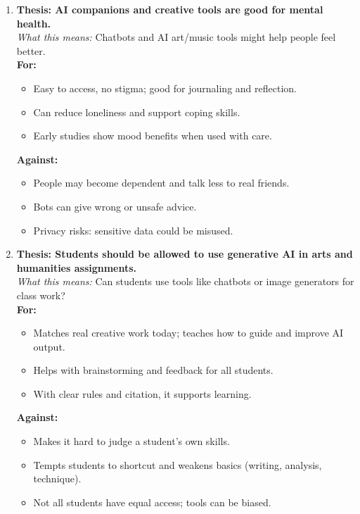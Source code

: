 \documentclass[12pt]{article}
\begin{document}
\begin{enumerate}
\item \textbf{Thesis: AI companions and creative tools are good for mental health.}\\
\emph{What this means:} Chatbots and AI art/music tools might help people feel better.\\
\textbf{For:}
\begin{itemize}
    \item Easy to access, no stigma; good for journaling and reflection.
    \item Can reduce loneliness and support coping skills.
    \item Early studies show mood benefits when used with care.
\end{itemize}
\textbf{Against:}
\begin{itemize}
    \item People may become dependent and talk less to real friends.
    \item Bots can give wrong or unsafe advice.
    \item Privacy risks: sensitive data could be misused.
\end{itemize}

\item \textbf{Thesis: Students should be allowed to use generative AI in arts and humanities assignments.}\\
\emph{What this means:} Can students use tools like chatbots or image generators for class work?\\
\textbf{For:}
\begin{itemize}
    \item Matches real creative work today; teaches how to guide and improve AI output.
    \item Helps with brainstorming and feedback for all students.
    \item With clear rules and citation, it supports learning.
\end{itemize}
\textbf{Against:}
\begin{itemize}
    \item Makes it hard to judge a student’s own skills.
    \item Tempts students to shortcut and weakens basics (writing, analysis, technique).
    \item Not all students have equal access; tools can be biased.
\end{itemize}


\end{enumerate}
\end{document}
